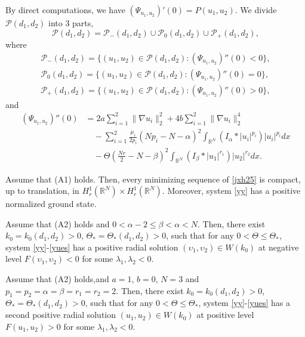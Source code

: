 \documentclass[reqno]{amsart}
\begin{document}
By direct computations, we have $(\Psi_{u_1,u_2})'(0)=P(u_1,u_2)$.
We divide $\mathcal{P}(d_1,d_2)$ into 3 parts,
\[
\mathcal{P}(d_1,d_2)= \mathcal{P}_{-}(d_1,d_2)\cup\mathcal{P}_{0}(d_1,d_2)
\cup\mathcal{P}_{+}(d_1,d_2),
\]
 where
\begin{gather*}
\mathcal{P}_{-}(d_1,d_2)=\{(u_1,u_2)\in\mathcal{P}(d_1,d_2):(\Psi_{u_1,u_2})''(0)<0\},\\
\mathcal{P}_{0}(d_1,d_2)=\{(u_1,u_2)\in\mathcal{P}(d_1,d_2):(\Psi_{u_1,u_2})''(0)=0\},\\
\mathcal{P}_{+}(d_1,d_2)=\{(u_1,u_2)\in\mathcal{P}(d_1,d_2):(\Psi_{u_1,u_2})''(0)>0\},
\end{gather*}
and
\begin{align*}
(\Psi_{u_1,u_2})''(0)
&=2a\sum_{i=1}^2\|\nabla u_i\|_2^2+4b\sum_{i=1}^2\|\nabla u_i\|_2^4 \\
&\quad -\sum_{i=1}^2\frac{\mu_i}{2p_i}(Np_i-N-\alpha)^2
\int_{\mathbb{R}^N}(I_\alpha\ast|u_i|^{p_i})|u_i|^{p_i}dx \\
&\quad -\Theta(\frac{Nr}{2}-N-\beta)^2
 \int_{\mathbb{R}^N}(I_\beta\ast|u_1|^{r_1})|u_2|^{r_2}dx.
\end{align*}

\begin{theorem} \label{thm1.1}
Assume that {\rm (A1)} holds. Then, every minimizing sequence of \eqref{jxh25}
is compact, up to translation, in
$H^1_r(\mathbb{R}^N)\times H^1_r(\mathbb{R}^N)$.
Moreover, system \eqref{yy} has a positive normalized ground state.
\end{theorem}

\begin{theorem} \label{thm1.2}
Assume that {\rm (A2)} holds and $0<\alpha-2\leq\beta<\alpha<N$.
Then, there exist $k_0=k_0(d_1,d_2)>0$, $\Theta_*=\Theta_*(d_1,d_2)>0$, such that
for any $0<\Theta\leq\Theta_*$,
system \eqref{yy}-\eqref{yues} has a positive radial solution
$(\upsilon_1,\upsilon_2)\in W(k_0)$ at negative
level $F(\upsilon_1,\upsilon_2)<0$ for some $\lambda_1,\lambda_2<0$.
 \end{theorem}

\begin{theorem} \label{thm1.3}
Assume that {\rm (A2)} holds,and $a=1$, $b=0$, $N=3$ and
$p_1=p_2=\alpha=\beta=r_1=r_2=2$. Then, there exist
$k_0= k_0(d_1,d_2)>0$, $\Theta_*=\Theta_*(d_1,d_2)>0$, such that for any
$0<\Theta\leq\Theta_*$,
system \eqref{yy}-\eqref{yues} has a second positive radial solution
$(u_1,u_2)\in W(k_0)$ at positive level $F(u_1,u_2)>0$
 for some $\lambda_1,\lambda_2<0$.
\end{theorem}
\end{document}
